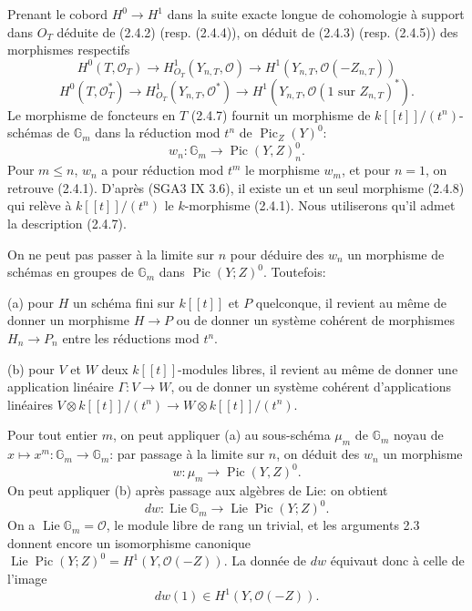 \documentclass[11pt,leqno]{article}
\DeclareMathOperator{\Lie}{Lie}
\DeclareMathOperator{\Pic}{Pic}
\newcommand{\OO}{\mathcal O}
\newcommand{\GG}{\mathbb G}
\begin{document}
Prenant le cobord $H^0\to H^1$ dans la suite exacte longue de cohomologie à support dans $O_T$ déduite de (2.4.2) (resp. (2.4.4)), on déduit de (2.4.3) (resp. (2.4.5)) des morphismes respectifs
\begin{equation}
        H^0(T,\OO_T)\longrightarrow H^1_{O_T}(Y_{n,T},\OO)\longrightarrow H^1(Y_{n,T},\OO(-Z_{n,T})) \tag{2.4.6}
\end{equation}
\begin{equation}
        H^0(T,\OO_T^*)\longrightarrow H^1_{O_T}(Y_{n,T},\OO^*)\longrightarrow H^1(Y_{n,T},\OO(1\text{ sur }Z_{n,T})^*). \tag{2.4.7}
\end{equation}
Le morphisme de foncteurs en $T$ (2.4.7) fournit un morphisme de $k[[t]]/(t^n)$-schémas de $\GG_m$ dans la réduction mod $t^n$ de $\Pic_Z(Y)^0$:
\begin{equation}
        w_n:\GG_m\longrightarrow\Pic(Y,Z)^0_n. \tag{2.4.8}
\end{equation}
Pour $m\le n$, $w_n$ a pour réduction mod $t^m$ le morphisme $w_m$, et pour $n=1$, on retrouve (2.4.1). D'après (SGA3 IX 3.6), il existe un et un seul morphisme (2.4.8) qui relève à $k[[t]]/(t^n)$ le $k$-morphisme (2.4.1). Nous utiliserons qu'il admet la description (2.4.7).

On ne peut pas passer à la limite sur $n$ pour déduire des $w_n$ un morphisme de schémas en groupes de $\GG_m$ dans $\Pic(Y;Z)^0$. Toutefois:

\noindent (a) pour $H$ un schéma fini sur $k[[t]]$ et $P$ quelconque, il revient au même de donner un morphisme $H\to P$ ou de donner un système cohérent de morphismes $H_n\to P_n$ entre les réductions mod $t^n$.

\noindent (b) pour $V$ et $W$ deux $k[[t]]$-modules libres, il revient au même de donner une application linéaire $\Gamma:V\to W$, ou de donner un système cohérent d'applications linéaires $V\otimes k[[t]]/(t^n)\to W\otimes k[[t]]/(t^n)$.

Pour tout entier $m$, on peut appliquer (a) au sous-schéma $\mu_m$ de $\GG_m$ noyau de $x\mapsto x^m:\GG_m\to\GG_m$: par passage à la limite sur $n$, on déduit des $w_n$ un morphisme
\begin{equation}
        w:\mu_m\longrightarrow\Pic(Y,Z)^0. \tag{2.4.9}
\end{equation}
On peut appliquer (b) après passage aux algèbres de Lie: on obtient
\begin{equation}
        dw:\Lie\GG_m\longrightarrow\Lie\Pic(Y;Z)^0. \tag{2.4.10}
\end{equation}
On a $\Lie\GG_m=\OO$, le module libre de rang un trivial, et les arguments 2.3 donnent encore un isomorphisme canonique $\Lie\Pic(Y;Z)^0=H^1(Y,\OO(-Z))$. La donnée de $dw$ équivaut donc à celle de l'image
\begin{equation}
        dw(1)\in H^1(Y,\OO(-Z)). \tag{2.4.11}
\end{equation}
\end{document}
